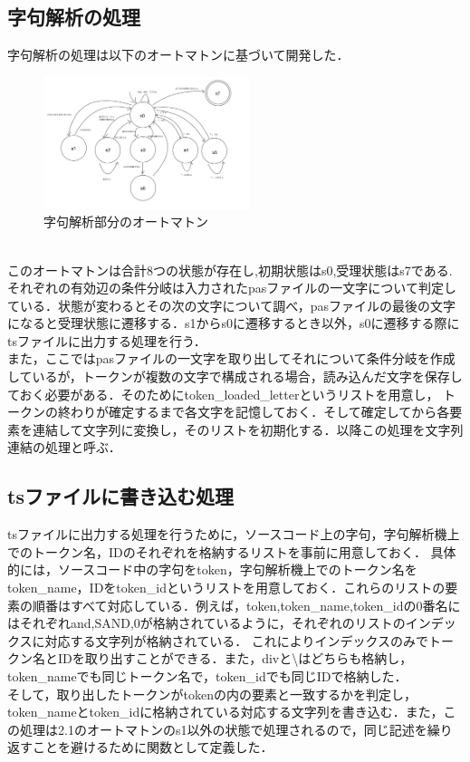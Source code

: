 \documentclass[dvipdfmx]{jarticle}
\begin{document}
\subsection{字句解析の処理}
字句解析の処理は以下のオートマトンに基づいて開発した．
\begin{figure}[h]
    \centering
    \includegraphics[width = 6cm, angle = -90]{automaton.png}
    \caption{字句解析部分のオートマトン}
\end{figure}
\\このオートマトンは合計8つの状態が存在し,初期状態はs0,受理状態はs7である.それぞれの有効辺の条件分岐は入力されたpasファイルの一文字について判定している．状態が変わるとその次の文字について調べ，pasファイルの最後の文字になると受理状態に遷移する．s1からs0に遷移するとき以外，s0に遷移する際にtsファイルに出力する処理を行う．
\\また，ここではpasファイルの一文字を取り出してそれについて条件分岐を作成しているが，トークンが複数の文字で構成される場合，読み込んだ文字を保存しておく必要がある．そのためにtoken\_loaded\_letterというリストを用意し，
トークンの終わりが確定するまで各文字を記憶しておく．そして確定してから各要素を連結して文字列に変換し，そのリストを初期化する．以降この処理を文字列連結の処理と呼ぶ．
\subsection{tsファイルに書き込む処理}
tsファイルに出力する処理を行うために，ソースコード上の字句，字句解析機上でのトークン名，IDのそれぞれを格納するリストを事前に用意しておく．
具体的には，ソースコード中の字句をtoken，字句解析機上でのトークン名をtoken\_name，IDをtoken\_idというリストを用意しておく．これらのリストの要素の順番はすべて対応している．例えば，token,token\_name,token\_idの0番名にはそれぞれand,SAND,0が格納されているように，それぞれのリストのインデックスに対応する文字列が格納されている．
これによりインデックスのみでトークン名とIDを取り出すことができる．また，divと\textbackslash はどちらも格納し，token\_nameでも同じトークン名で，token\_idでも同じIDで格納した．
\\そして，取り出したトークンがtokenの内の要素と一致するかを判定し，token\_nameとtoken\_idに格納されている対応する文字列を書き込む．また，この処理は2.1のオートマトンのs1以外の状態で処理されるので，同じ記述を繰り返すことを避けるために関数として定義した．
\end{document}
